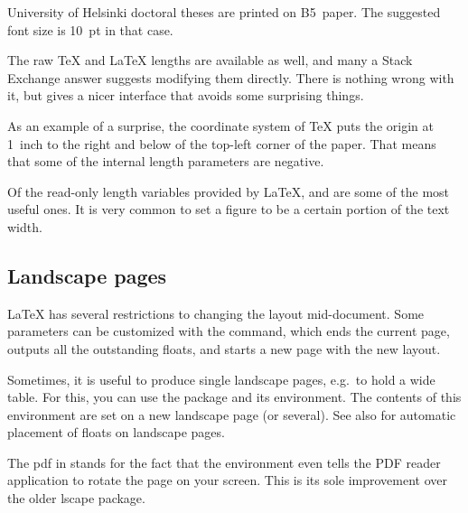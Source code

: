 \begin{remark}
University of Helsinki doctoral theses are printed on B5~paper.
The suggested font size is 10~pt in that case.
\end{remark}

\begin{warning}
The raw \TeX{} and \LaTeX{} lengths are available as well,
and many a Stack Exchange answer suggests modifying them directly.
There is nothing wrong with it, but  gives a nicer interface
that avoids some surprising things.
\end{warning}

\begin{technote}
As an example of a surprise, the coordinate system of \TeX{}
puts the origin at 1~inch to the right and below of the top-left corner of the paper.
That means that some of the internal length parameters are negative.
\end{technote}


Of the read-only length variables provided by \LaTeX{},
 and  are some of the most useful ones.
It is very common to set a figure to be a certain portion of the text width.


%
%
\subsection{Landscape pages}\label{sec:landscape pages}

\LaTeX{} has several restrictions to changing the layout mid-document.
Some parameters can be customized with the  command,
which ends the current page, outputs all the outstanding floats,
and starts a new page with the new layout.

Sometimes, it is useful to produce single landscape pages, e.g.\ to hold a wide table.
For this, you can use the  package
and its  environment.
The contents of this environment are set on a new landscape page (or several).
See also  for automatic placement of floats on landscape pages.

\begin{technote}
The \textsf{pdf} in  stands for the fact
that the environment even tells the PDF reader application to rotate the page on your screen.
This is its sole improvement over the older \textsf{lscape} package.
\end{technote}



